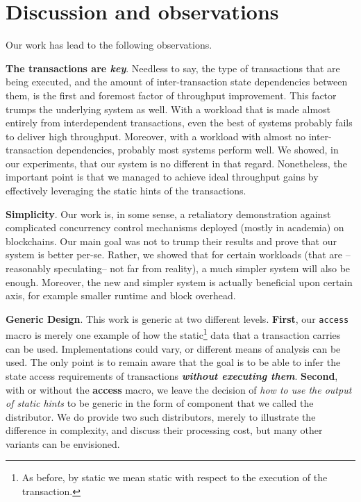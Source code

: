 \section{Discussion and observations} \label{chap_conc:sec:discussion}

Our work has lead to the following observations.

\textbf{The transactions are \textit{key}}. Needless to say, the type of transactions that are being
executed, and the amount of inter-transaction state dependencies between them, is the first and
foremost factor of throughput improvement. This factor trumps the underlying system as well. With a
workload that is made almost entirely from interdependent transactions, even the best of systems
probably fails to deliver high throughput. Moreover, with a workload with almost no
inter-transaction dependencies, probably most systems perform well. We showed, in our experiments,
that our system is no different in that regard. Nonetheless, the important point is that we managed
to achieve ideal throughput gains by effectively leveraging the static hints of the transactions.

\textbf{Simplicity}. Our work is, in some sense, a retaliatory demonstration against complicated
concurrency control mechanisms deployed (mostly in academia) on blockchains. Our main goal was not
to trump their results and prove that our system is better per-se. Rather, we showed that for
certain workloads (that are --reasonably speculating-- not far from reality), a much simpler system
will also be enough. Moreover, the new and simpler system is actually beneficial upon certain axis,
for example smaller runtime and block overhead.

\textbf{Generic Design}. This work is generic at two different levels. \textbf{First}, our
\texttt{access} macro is merely one example of how the static\footnote{As before, by static we mean
static with respect to the execution of the transaction.} data that a transaction carries can be
used. Implementations could vary, or different means of analysis can be used. The only point is to
remain aware that the goal is to be able to infer the state access requirements of transactions
\textit{\textbf{without executing them}}. \textbf{Second}, with or without the \textbf{access}
macro, we leave the decision of \textit{how to use the output of static hints} to be generic in the
form of component that we called the distributor. We do provide two such distributors, merely to
illustrate the difference in complexity, and discuss their processing cost, but many other variants
can be envisioned.

